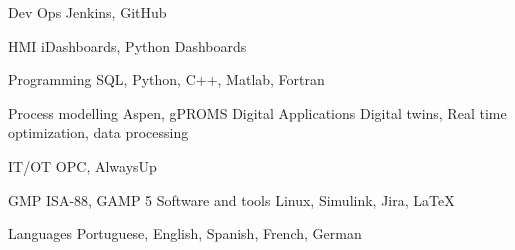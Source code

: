 

\begin{cvskills}

  \cvskill
    {Dev Ops} %
    {Jenkins, GitHub} %


  \cvskill
    {HMI} %
    {iDashboards, Python Dashboards} %

  \cvskill
    {Programming} %
    {SQL, Python, C++, Matlab, Fortran} %

  \cvskill
    {Process modelling} %
    {Aspen, gPROMS} %
  \cvskill
    {Digital Applications} %
    {Digital twins, Real time optimization, data processing} %

  \cvskill
    {IT/OT} %
    {OPC, AlwaysUp} %

  \cvskill
    {GMP} %
    {ISA-88, GAMP 5} %
  \cvskill
    {Software and tools} %
    {Linux, Simulink, Jira, LaTeX} %


  \cvskill
    {Languages} %
    {Portuguese, English, Spanish, French, German} %

\end{cvskills}